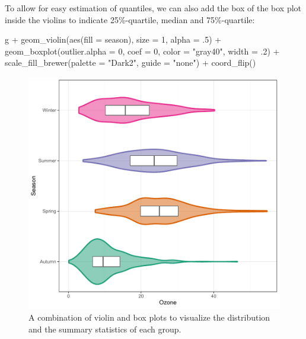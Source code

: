 \documentclass[
]{krantz}
\makeatletter
\newenvironment{Shaded}{\begin{snugshade}}{\end{snugshade}}
\newcommand{\AttributeTok}[1]{\textcolor[rgb]{0.61,0.61,0.61}{#1}}
\newcommand{\DecValTok}[1]{\textcolor[rgb]{0.06,0.06,0.06}{#1}}
\newcommand{\FunctionTok}[1]{\textcolor[rgb]{0,0,0}{#1}}
\newcommand{\NormalTok}[1]{#1}
\newcommand{\SpecialCharTok}[1]{\textcolor[rgb]{0,0,0}{#1}}
\newcommand{\StringTok}[1]{\textcolor[rgb]{0.5,0.5,0.5}{#1}}
\newenvironment{kframe}{%
\medskip{}
\setlength{\fboxsep}{.8em}
 \def\at@end@of@kframe{}%
 \ifinner\ifhmode%
  \def\at@end@of@kframe{\end{minipage}}%
  \begin{minipage}{\columnwidth}%
 \fi\fi%
 \def\FrameCommand##1{\hskip\@totalleftmargin \hskip-\fboxsep
 \colorbox{shadecolor}{##1}\hskip-\fboxsep
     \hskip-\linewidth \hskip-\@totalleftmargin \hskip\columnwidth}%
 \MakeFramed {\advance\hsize-\width
   \@totalleftmargin\z@ \linewidth\hsize
   \@setminipage}}%
 {\par\unskip\endMakeFramed%
 \at@end@of@kframe}
\renewenvironment{Shaded}{\begin{kframe}}{\end{kframe}}
\makeatother
\begin{document}
To allow for easy estimation of quantiles, we can also add the box of the box plot inside the violins to indicate 25\%-quartile, median and 75\%-quartile:

\begin{Shaded}
\begin{Highlighting}[]
\NormalTok{g }\SpecialCharTok{+} \FunctionTok{geom\_violin}\NormalTok{(}\FunctionTok{aes}\NormalTok{(}\AttributeTok{fill =}\NormalTok{ season), }\AttributeTok{size =} \DecValTok{1}\NormalTok{, }\AttributeTok{alpha =}\NormalTok{ .}\DecValTok{5}\NormalTok{) }\SpecialCharTok{+}
    \FunctionTok{geom\_boxplot}\NormalTok{(}\AttributeTok{outlier.alpha =} \DecValTok{0}\NormalTok{, }\AttributeTok{coef =} \DecValTok{0}\NormalTok{,}
                 \AttributeTok{color =} \StringTok{"gray40"}\NormalTok{, }\AttributeTok{width =}\NormalTok{ .}\DecValTok{2}\NormalTok{) }\SpecialCharTok{+}
    \FunctionTok{scale\_fill\_brewer}\NormalTok{(}\AttributeTok{palette =} \StringTok{"Dark2"}\NormalTok{, }\AttributeTok{guide =} \StringTok{"none"}\NormalTok{) }\SpecialCharTok{+}
    \FunctionTok{coord\_flip}\NormalTok{()}
\end{Highlighting}
\end{Shaded}

\begin{figure}
\centering
\includegraphics{bookdown_files/figure-latex/violin-jitter-box-1.pdf}
\caption{\label{fig:violin-jitter-box}A combination of violin and box plots to visualize the distribution and the summary statistics of each group.}
\end{figure}
\end{document}
